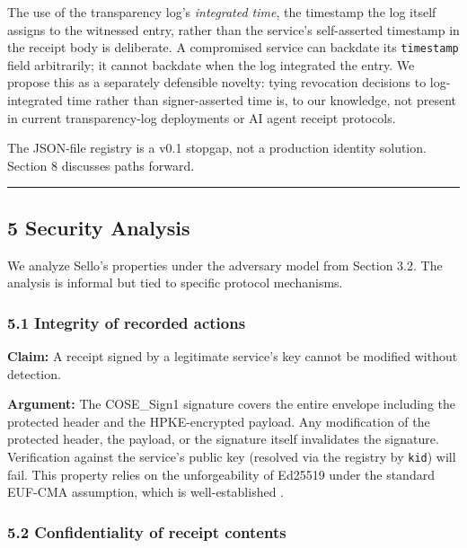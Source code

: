 \documentclass[
  11pt,
]{article}
\begin{document}
The use of the transparency log's \emph{integrated time}, the timestamp
the log itself assigns to the witnessed entry, rather than the service's
self-asserted timestamp in the receipt body is deliberate. A compromised
service can backdate its \texttt{timestamp} field arbitrarily; it cannot
backdate when the log integrated the entry. We propose this as a
separately defensible novelty: tying revocation decisions to
log-integrated time rather than signer-asserted time is, to our
knowledge, not present in current transparency-log deployments or AI
agent receipt protocols.

The JSON-file registry is a v0.1 stopgap, not a production identity
solution. Section 8 discusses paths forward.

\begin{center}\rule{0.5\linewidth}{0.5pt}\end{center}

\hypertarget{security-analysis}{%
\subsection{5 Security Analysis}\label{security-analysis}}

We analyze Sello's properties under the adversary model from Section
3.2. The analysis is informal but tied to specific protocol mechanisms.

\hypertarget{integrity-of-recorded-actions}{%
\subsubsection{5.1 Integrity of recorded
actions}\label{integrity-of-recorded-actions}}

\textbf{Claim:} A receipt signed by a legitimate service's key cannot be
modified without detection.

\textbf{Argument:} The COSE\_Sign1 signature covers the entire envelope
including the protected header and the HPKE-encrypted payload. Any
modification of the protected header, the payload, or the signature
itself invalidates the signature. Verification against the service's
public key (resolved via the registry by \texttt{kid}) will fail. This
property relies on the unforgeability of Ed25519 under the standard
EUF-CMA assumption, which is well-established
\citep{bernstein2012ed25519}.

\hypertarget{confidentiality-of-receipt-contents}{%
\subsubsection{5.2 Confidentiality of receipt
contents}\label{confidentiality-of-receipt-contents}}
\end{document}
